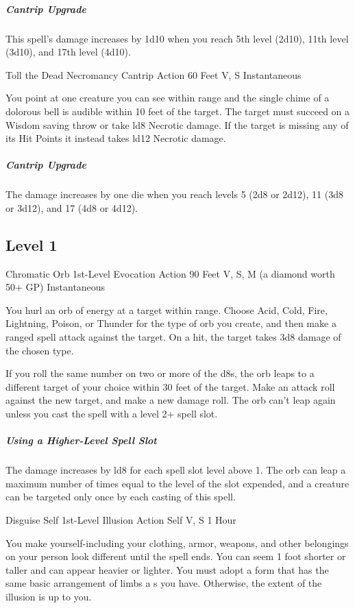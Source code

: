 \documentclass[letterpaper,openany,oneside,twocolumn]{book}
\begin{document}
\subparagraph*{Cantrip Upgrade} This spell's damage increases by 1d10 when you reach 5th level (2d10), 11th level (3d10), and 17th level (4d10).

\DndSpellHeader
  {Toll the Dead}
  {Necromancy Cantrip}
  {Action}
  {60 Feet}
  {V, S}
  {Instantaneous}

You point at one creature you can see within range and the single chime of a dolorous bell is audible within 10 feet of the target. The target must succeed on a Wisdom saving throw or take ld8 Necrotic damage. If the target is missing any of its Hit Points it instead takes ld12 Necrotic damage.

\subparagraph*{Cantrip Upgrade} The damage increases by one die when you reach levels 5 (2d8 or 2d12), 11 (3d8 or 3d12), and 17 (4d8 or 4d12).

\eject

\subsection*{Level 1}

\DndSpellHeader
  {Chromatic Orb}
  {1st-Level Evocation}
  {Action}
  {90 Feet}
  {V, S, M (a diamond worth 50+ GP)}
  {Instantaneous}

You hurl an orb of energy at a target within range. Choose Acid, Cold, Fire, Lightning, Poison, or Thunder for the type of orb you create, and then make a ranged spell attack against the target. On a hit, the target takes 3d8 damage of the chosen type.

If you roll the same number on two or more of the d8s, the orb leaps to a different target of your choice within 30 feet of the target. Make an attack roll against the new target, and make a new damage roll. The orb can't leap again unless you cast the spell with a level 2+ spell slot.

\subparagraph*{Using a Higher-Level Spell Slot} The damage increases by ld8 for each spell slot level above 1. The orb can leap a maximum number of times equal to the level of the slot expended, and a creature can be targeted only once by each casting of this spell.

\DndSpellHeader
  {Disguise Self}
  {1st-Level Illusion}
  {Action}
  {Self}
  {V, S}
  {1 Hour}

You make yourself-including your clothing, armor, weapons, and other belongings on your person look different until the spell ends. You can seem 1 foot shorter or taller and can appear heavier or lighter. You must adopt a form that has the same basic arrangement of limbs a s you have. Otherwise, the extent of the illusion is up to you.
\end{document}
